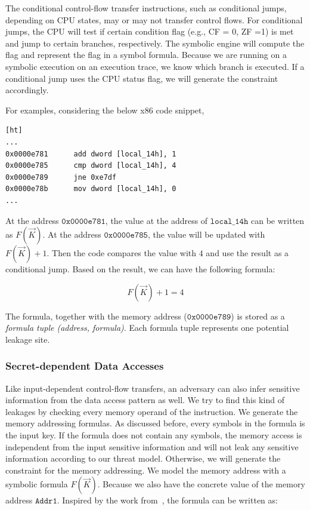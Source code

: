 The conditional control-flow transfer instructions, such as conditional jumps, depending on CPU states, may or may not transfer control flows. For conditional jumps, the CPU will test if certain condition flag
(e.g., CF = 0, ZF =1) is met and jump to certain branches, respectively.
The symbolic engine will compute the flag and represent the flag in a symbol
formula. Because we are running on a symbolic execution on an execution trace, we know which branch is executed.
If a conditional jump uses the CPU status flag, we will generate the constraint accordingly.

For examples, considering the below x86 code snippet,

\begin{lstlisting}[xleftmargin=.3\textwidth, xrightmargin=.2\textwidth, frame=none][ht]
...
0x0000e781      add dword [local_14h], 1
0x0000e785      cmp dword [local_14h], 4
0x0000e789      jne 0xe7df
0x0000e78b      mov dword [local_14h], 0
...
\end{lstlisting}

At the address $\mathtt{0x0000e781}$, the value at the address of $\mathtt{local\_14h}$ can be written as $F(\vec{K})$. At the address $\mathtt{0x0000e785}$, the value will be updated with $F(\vec{K})+1$. Then the code compares the value with $4$ and use the result as a conditional jump. Based on the result, we can have the following formula:

$$F(\vec{K}) + 1 = 4$$

The formula, together with the memory address ($\mathtt{0x0000e789}$) is stored as a \textit{formula tuple (address, formula)}. Each formula tuple represents one potential leakage site.

\subsubsection{Secret-dependent Data Accesses}
Like input-dependent control-flow transfers, an adversary can also infer sensitive information from the data access pattern as well. We try to find this kind of leakages by checking every memory operand of the instruction. We generate the memory addressing
formulas. As discussed before, every symbols in the formula is the input key. If the formula does not contain any symbols, the memory access is independent
from the input sensitive information and will not leak any sensitive information according to our threat model. Otherwise, we will generate the constraint for
the memory addressing. We model the memory address with a symbolic formula $F(\vec{K})$. Because we also have the concrete value of the memory address $\mathtt{Addr1}$. Inspired by the work from~\cite{203878}, the formula can be written as:

